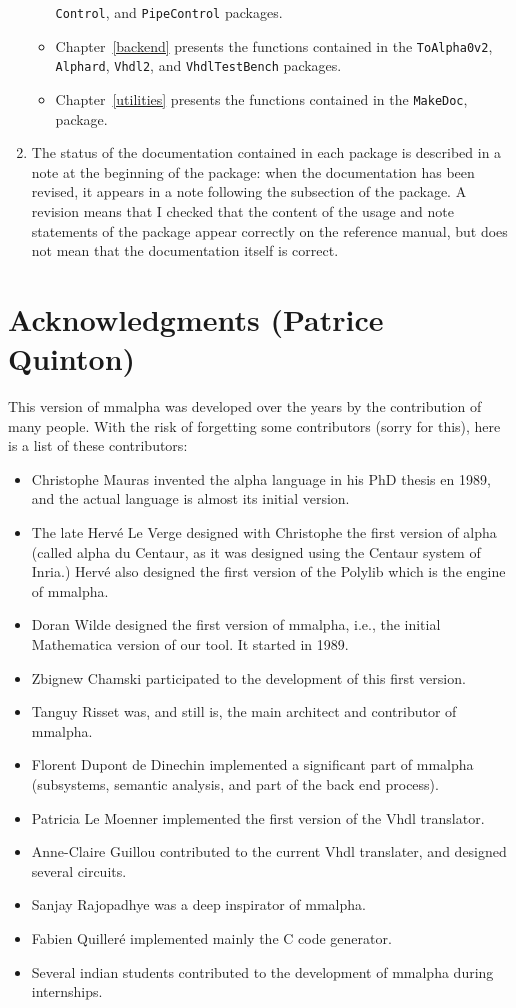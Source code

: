 \documentclass[11pt]{report}
\newcommand{\MMAlpha}{{\sc mmalpha}}
\newcommand{\MMAlfa}{{\sc mmalpha}}
\newcommand{\Alfa}{{\sc alpha}}
\newcommand{\mma}{{\sc Mathematica}}
\begin{document}
\begin{enumerate}
\begin{itemize}
\texttt{Control},
and \texttt{PipeControl}
packages. 
\item Chapter~\ref{backend} presents the functions contained in the \texttt{ToAlpha0v2},
\texttt{Alphard},
\texttt{Vhdl2},
and \texttt{VhdlTestBench}
packages. 
\item Chapter~\ref{utilities} presents the functions contained in the \texttt{MakeDoc},
package. 
\end{itemize}
\item The status of the documentation contained in each package 
is described in a note at the beginning of the package: when the documentation has been
revised, it appears in a note following the subsection of the package. A revision
means that I checked that the content of the usage and note statements of the
package appear correctly on the reference manual, but does not mean that the
documentation itself is correct.
\end{enumerate}
\newpage
\section*{Acknowledgments (Patrice Quinton)}
This version of \MMAlpha{} was developed over the years by the contribution of
many people. With the risk of forgetting some contributors (sorry for this), 
here is a list of these contributors:
\begin{itemize}
\item Christophe Mauras invented the \Alfa{} language in his PhD thesis
en 1989, and the actual language is almost its initial version.
\item The late Herv\'e Le Verge designed with Christophe the first 
version of \Alfa{} (called \Alfa{} du Centaur, as it was designed 
using the Centaur system of Inria.) Herv\'e also designed the first
version of the Polylib which is the engine of \MMAlfa{}.
\item Doran Wilde designed the first version of \MMAlfa{}, i.e., 
the initial \mma{} version of our tool. It started in 1989. 
\item Zbignew Chamski participated to the development of 
this first version. 
\item Tanguy Risset was, and still is, the main architect and 
contributor of \MMAlfa{}. 
\item Florent Dupont de Dinechin implemented a significant part of 
\MMAlfa{} (subsystems, semantic analysis, and part of the back end 
process).
\item Patricia Le Moenner implemented the first version of the 
Vhdl translator.
\item Anne-Claire Guillou contributed to the current Vhdl translater, 
and designed several circuits.
\item Sanjay Rajopadhye was a deep inspirator of \MMAlfa{}.
\item Fabien Quiller\'e implemented mainly the C code generator.
\item Several indian students contributed to the development of
\MMAlfa{} during internships.
\end{itemize}
\end{document}
